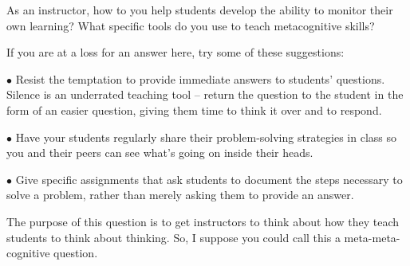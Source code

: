 

As an instructor, how to you help students develop the ability to monitor their own learning?  What specific tools do you use to teach metacognitive skills?







If you are at a loss for an answer here, try some of these suggestions:

\medskip
\goodbreak
\item{$\bullet$} Resist the temptation to provide immediate answers to students' questions.  Silence is an underrated teaching tool -- return the question to the student in the form of an easier question, giving them time to think it over and to respond.
\item{$\bullet$} Have your students regularly share their problem-solving strategies in class so you and their peers can see what's going on inside their heads.
\item{$\bullet$} Give specific assignments that ask students to document the steps necessary to solve a problem, rather than merely asking them to provide an answer.
\medskip







The purpose of this question is to get instructors to think about how they teach students to think about thinking.  So, I suppose you could call this a meta-meta-cognitive question.



